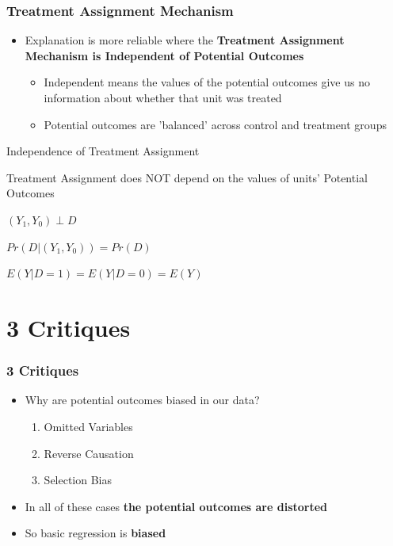 \documentclass[xcolor=x11names,compress]{beamer}\usepackage[]{graphicx}\usepackage[]{color}
\renewcommand{\(}{\begin{columns}}
\renewcommand{\)}{\end{columns}}
\newcommand{\<}[1]{\begin{column}{#1}}
\renewcommand{\>}{\end{column}}
\begin{document}
\begin{frame}
\frametitle{Treatment Assignment Mechanism}
\begin{itemize}
\item Explanation is more reliable where the \textbf{Treatment Assignment Mechanism is Independent of Potential Outcomes}
\pause
\begin{itemize}
\item Independent means the values of the potential outcomes give us no information about whether that unit was treated
\pause
\item Potential outcomes are 'balanced' across control and treatment groups
\pause
\end{itemize}
\end{itemize}
\begin{block}{Independence of Treatment Assignment}
\item Treatment Assignment does NOT depend on the values of units' Potential Outcomes
\pause 
\item $(Y_1,Y_0) \perp D$
\pause
\item $Pr(D|(Y_1,Y_0)) = Pr(D)$
\pause
\item $E(Y|D=1) = E(Y|D=0) = E(Y)$
\end{block}
\end{frame}

\section{3 Critiques}

\begin{frame}
\frametitle{3 Critiques}
\begin{itemize}
\item Why are potential outcomes biased in our data?
\pause
\begin{enumerate}
\item Omitted Variables
\pause
\item Reverse Causation
\pause
\item Selection Bias
\pause
\end{enumerate}
\item In all of these cases \textbf{the potential outcomes are distorted}
\pause
\item So basic regression is \textbf{biased}
\end{itemize}
\end{frame}
\end{document}
